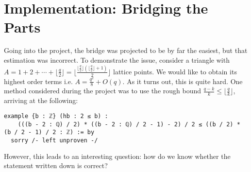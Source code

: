 \section{Implementation: Bridging the Parts} \label{sec:impl_bridge}

Going into the project, the bridge was projected to be by far the easiest, but that estimation was incorrect. To demonstrate the issue, consider a triangle with \(A = 1 + 2 + \cdots + \lfloor\frac{q}{2}\rfloor = \lfloor\frac{\lfloor\frac{q}{2}\rfloor\left(\lfloor\frac{q}{2}\rfloor + 1\right)}{2}\rfloor\) lattice points. We would like to obtain its highest order terms i.e. \(A = \frac{q^2}{8} + O(q)\). As it turns out, this is quite hard. One method considered during the project was to use the rough bound \(\frac{q - k}{k} \leq \lfloor \frac{q}{k} \rfloor\), arriving at the following:

\begin{verbatim}
example {b : ℤ} (hb : 2 ≤ b) :
    (((b - 2 : ℚ) / 2) * ((b - 2 : ℚ) / 2 - 1) - 2) / 2 ≤ ((b / 2) * (b / 2 - 1) / 2 : ℤ) := by
  sorry /- left unproven -/
\end{verbatim}

However, this leads to an interesting question: how do we know whether the statement written down is correct?
